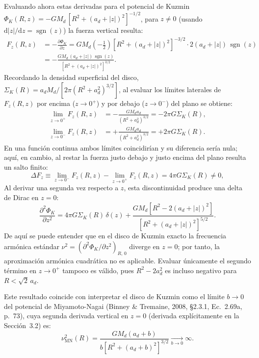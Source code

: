 \documentclass[11pt,letterpaper]{article}
\begin{document}
Evaluando ahora estas derivadas para el potencial de Kuzmin $\Phi_K(R, z) = -GM_d\,[R^2 + (a_d + |z|)^2]^{-1/2}$, para $z \neq 0$ (usando $\mathrm{d}|z|/\mathrm{d}z = \operatorname{sgn}(z)$) la fuerza vertical resulta:
\begin{align}
    F_z(R, z) &= -\frac{\partial \Phi_K}{\partial z}
    = GM_d\left(-\frac{1}{2}\right)\left[R^2 + (a_d + |z|)^2\right]^{-3/2} \cdot 2(a_d + |z|)\,\operatorname{sgn}(z) \nonumber \\
    &= -\frac{GM_d\,(a_d + |z|)\,\operatorname{sgn}(z)}{\left[R^2 + (a_d + |z|)^2\right]^{3/2}}.
    \label{eq:Fz_kuzmin}
\end{align}
Recordando la densidad superficial del disco, $\Sigma_K(R) = a_d M_d / [2\pi(R^2 + a_d^2)^{3/2}]$, al evaluar los límites laterales de $F_z(R, z)$ por encima ($z \to 0^+$) y por debajo ($z \to 0^-$) del plano se obtiene:
\begin{align}
    \lim_{z \to 0^+} F_z(R, z) &= -\frac{GM_d a_d}{(R^2 + a_d^2)^{3/2}} = -2\pi G \Sigma_K(R), \nonumber \\
    \lim_{z \to 0^-} F_z(R, z) &= +\frac{GM_d a_d}{(R^2 + a_d^2)^{3/2}} = +2\pi G \Sigma_K(R).
    \label{eq:Fz_jump}
\end{align}
En una función continua ambos límites coincidirían y su diferencia sería nula; aquí, en cambio, al restar la fuerza justo debajo y justo encima del plano resulta un salto finito:
\begin{equation}
    \Delta F_z \equiv \lim_{z \to 0^-} F_z(R, z) - \lim_{z \to 0^+} F_z(R, z) = 4\pi G \Sigma_K(R) \neq 0,
\end{equation}
Al derivar una segunda vez respecto a $z$, esta discontinuidad produce una delta de Dirac en $z = 0$:
\begin{equation}
    \frac{\partial^2 \Phi_K}{\partial z^2} = 4\pi G \Sigma_K(R)\,\delta(z) + \frac{GM_d\left[R^2 - 2(a_d + |z|)^2\right]}{\left[R^2 + (a_d + |z|)^2\right]^{5/2}}.
    \label{eq:d2phi_dz2}
\end{equation}
De aquí se puede entender que en el disco de Kuzmin exacto la frecuencia armónica estándar $\nu^2 = (\partial^2\Phi_K/\partial z^2)_{R,\,0}$ diverge en $z = 0$; por tanto, la aproximación armónica cuadrática no es aplicable. Evaluar únicamente el segundo término en $z \to 0^+$ tampoco es válido, pues $R^2 - 2a_d^2$ es incluso negativo para $R < \sqrt{2}\,a_d$.

Este resultado coincide con interpretar el disco de Kuzmin como el límite $b \to 0$ del potencial de Miyamoto-Nagai (Binney \& Tremaine, 2008, \S 2.3.1, Ec.~2.69a, p.~73), cuya segunda derivada vertical en $z = 0$ (derivada explícitamente en la Sección~3.2) es:
\begin{equation}
    \nu_{\mathrm{MN}}^2(R)
    = \frac{GM_d(a_d + b)}{b\left[R^2 + (a_d + b)^2\right]^{3/2}}
    \xrightarrow[b \to 0]{} \infty.
\end{equation}
\end{document}

